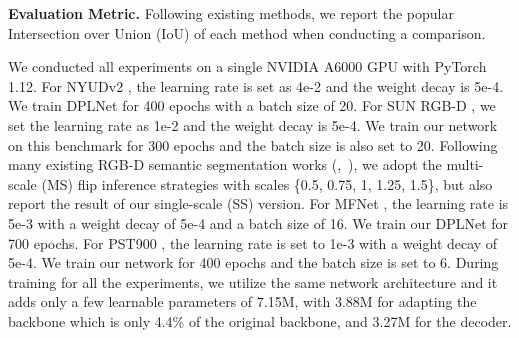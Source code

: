 \documentclass[10pt,twocolumn,letterpaper]{article}
\begin{document}
\vspace{0.3em}
\noindent
\textbf{Evaluation Metric.} Following existing methods, we report the popular Intersection over Union (IoU) of each method when conducting a comparison.

\vspace{0.3em}
We conducted all experiments on a single NVIDIA A6000 GPU with PyTorch 1.12. For NYUDv2 \cite{nyuv2}, the learning rate is set as 4e{-2} and the weight decay is 5e{-4}. We train DPLNet for 400 epochs with a batch size of 20. For SUN RGB-D \cite{sunrgbd}, we set the learning rate as 1e{-2} and the weight decay is 5e{-4}. We train our network on this benchmark for 300 epochs and the batch size is also set to 20. Following many existing RGB-D semantic segmentation works (\eg,~\cite{DFormer}), we adopt the multi-scale (MS) flip inference strategies with scales \{0.5, 0.75, 1, 1.25, 1.5\}, but also report the result of our single-scale (SS) version.
For MFNet \cite{mfnet}, the learning rate is 5e{-3} with a weight decay of 5e{-4} and a batch size of 16. We train our DPLNet for 700 epochs.
For PST900 \cite{pst900}, the learning rate is set to 1e{-3} with a weight decay of 5e{-4}. We train our network for 400 epochs and the batch size is set to 6. During training for all the experiments, we utilize the same network architecture and it adds only a few learnable parameters of 7.15M, with 3.88M for adapting the backbone which is only 4.4\% of the original backbone, and 3.27M for the decoder.
\end{document}
